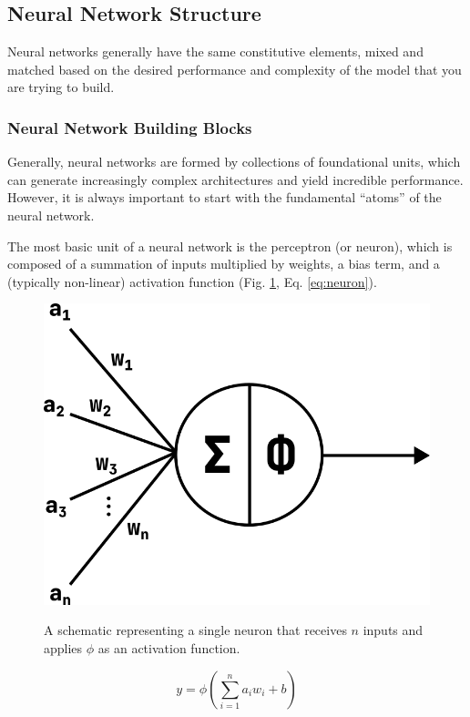 \subsection{Neural Network Structure}
Neural networks generally have the same constitutive elements, mixed and matched based on the desired performance and complexity of the model that you are trying to build.

\subsubsection{Neural Network Building Blocks}
Generally, neural networks are formed by collections of foundational units, which can generate increasingly complex architectures and yield incredible performance. However, it is always important to start with the fundamental ``atoms'' of the neural network.

The most basic unit of a neural network is the perceptron (or neuron), which is composed of a summation of inputs multiplied by weights, a bias term, and a (typically non-linear) activation function (Fig. \ref{fig:neuron}, Eq. \ref{eq:neuron}). 

\begin{figure}[h!]
    \begin{center}
        {\includegraphics[width=0.55\linewidth]{figs/background/png/neuron.png}}
    \end{center}
    \caption{A schematic representing a single neuron that receives $n$ inputs and applies $\phi$ as an activation function.}
    \label{fig:neuron}
\end{figure}

\begin{equation}
    y = \phi(\sum_{i=1}^{n}a_i w_i + b)
    \label{eq:neuron}
\end{equation}

